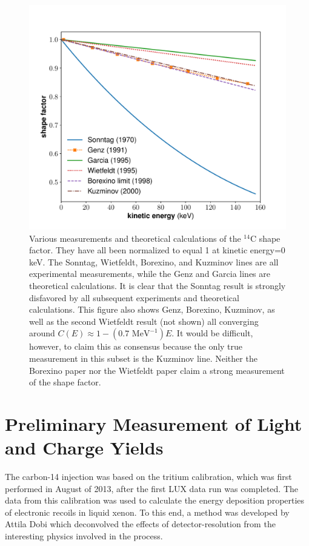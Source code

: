 \begin{figure}[h!]
\centering
\includegraphics[width=\textwidth]{Figures/ShapeFac_compare.pdf}
\caption{Various measurements and theoretical calculations of the $^{14}$C shape factor. They have all been normalized to equal 1 at kinetic energy=0 keV. The Sonntag\cite{C14_Sonntag}, Wietfeldt\cite{C14_Wietfeldt}, Borexino\cite{C14_Borexino}, and Kuzminov\cite{C14_Kuzminov} lines are all experimental measurements, while the Genz\cite{C14_Genz} and Garcia\cite{C14_Garcia} lines are theoretical calculations. It is clear that the Sonntag result is strongly disfavored by all subsequent experiments and theoretical calculations. This figure also shows Genz, Borexino, Kuzminov, as well as the second Wietfeldt result (not shown) all converging around $C(E)\approx 1-(0.7 \text{ \ MeV}^{-1})E$. It would be difficult, however, to claim this as consensus because the only true measurement in this subset is the Kuzminov line. Neither the Borexino paper nor the Wietfeldt paper claim a strong measurement of the shape factor.} 
\label{fig:C14_shape}
\end{figure}



\section{Preliminary Measurement of Light and Charge Yields}
The carbon-14 injection was based on the tritium calibration, which was first performed in August of 2013, after the first LUX data run was completed. The data from this calibration was used to calculate the energy deposition properties of electronic recoils in liquid xenon. To this end, a method was developed by Attila Dobi which deconvolved the effects of detector-resolution from the interesting physics involved in the process\cite{lux_tritium,attila}. 

